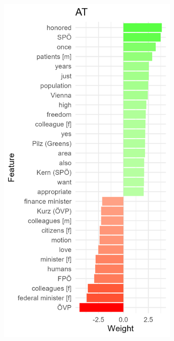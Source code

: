 \documentclass{article}
\begin{document}
\begin{figure}
     \hfill
     \begin{subfigure}[b]{0.3\textwidth}
         \centering
         \includegraphics[width=\textwidth]{AT/vis/AT_weights.png}
     \end{subfigure}
     \hfill

\end{figure}
\end{document}
